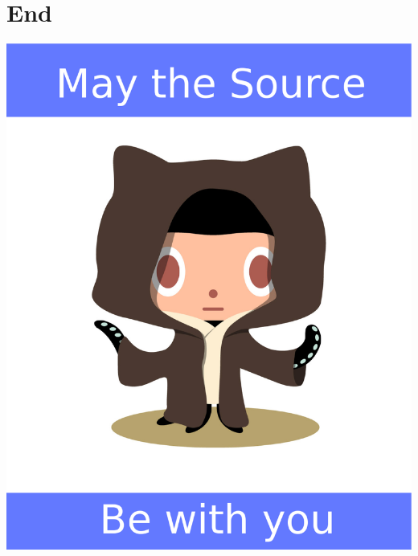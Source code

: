 \documentclass[style=husky,display=slides,clock]{powerdot}
\begin{document}
\section[tocsection=hidden,slide=false]{End}
\begin{emptyslide}{}
	\centering
	\includegraphics[scale=0.2]{octobiwan_source.eps}
\end{emptyslide}
\end{document}
